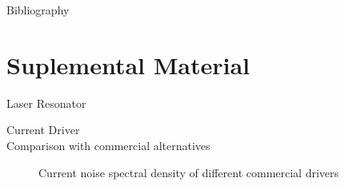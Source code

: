 \documentclass[color={accentcolor=1b}, authorontitle=true]{tudabeamer}
\begin{document}
\begin{frame}[allowframebreaks]{Bibliography}
    
    
\end{frame}

\section*{Suplemental Material}
\begin{frame}{Laser Resonator}
\end{frame}

\begin{frame}{Current Driver\\\textnormal{\small{Comparison with commercial alternatives}}}
    \begin{figure}
        \centering
        \scalebox{0.7}{
            
         }
        \caption{Current noise spectral density of different commercial drivers}
    \end{figure}
\end{frame}
\end{document}
